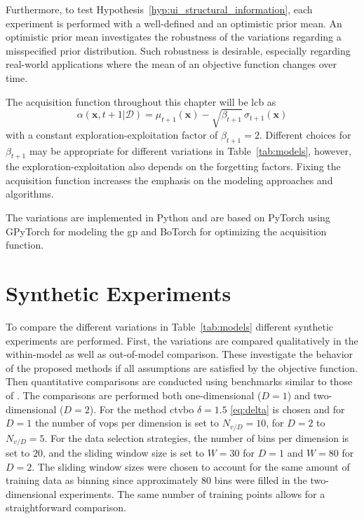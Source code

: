 Furthermore, to test Hypothesis~\ref{hyp:ui_structural_information}, each experiment is performed with a well-defined and an optimistic prior mean.
An optimistic prior mean investigates the robustness of the variations regarding a misspecified prior distribution. Such robustness is desirable, especially regarding real-world applications where the mean of an objective function changes over time.

The acquisition function throughout this chapter will be \gls{lcb} as
\begin{equation}
    \alpha(\mathbf{x}, t+1|\mathcal{D}) = \mu_{t+1}(\mathbf{x}) - \sqrt{\beta_{t+1}}\, \sigma_{t+1}(\mathbf{x})
    \label{eq:results_lcb}
\end{equation}
with a constant exploration-exploitation factor of $\beta_{t+1}=2$. Different choices for $\beta_{t+1}$ may be appropriate for different variations in Table~\ref{tab:models}, however, the exploration-exploitation also depends on the forgetting factors. Fixing the acquisition function increases the emphasis on the modeling approaches and algorithms.

The variations are implemented in Python and are based on PyTorch \cite{Paszke_2019} using GPyTorch \cite{Gardner_2018} for modeling the \gls{gp} and BoTorch \cite{Balandat_2020} for optimizing the acquisition function.

\section{Synthetic Experiments}
\label{sec:synthetic_experiments}

To compare the different variations in Table~\ref{tab:models} different synthetic experiments are performed. First, the variations are compared qualitatively in the within-model as well as out-of-model comparison. These investigate the behavior of the proposed methods if all assumptions are satisfied by the objective function.
Then quantitative comparisons are conducted using benchmarks similar to those of \textcite{Renganathan_2020}.
The comparisons are performed both one-dimensional ($D=1$) and two-dimensional ($D=2$). For the method \gls{ctvbo} $\delta=1.5$ \eqref{eq:delta} is chosen and for $D=1$ the number of \glspl{vop} per dimension is set to $N_{v/D}=10$, for $D=2$ to $N_{v/D}=5$. For the data selection strategies, the number of bins per dimension is set to $20$, and the sliding window size is set to $W=30$ for $D=1$ and $W=80$ for $D=2$. The sliding window sizes were chosen to account for the same amount of training data as binning since approximately $80$ bins were filled in the two-dimensional experiments. The same number of training points allows for a straightforward comparison.

